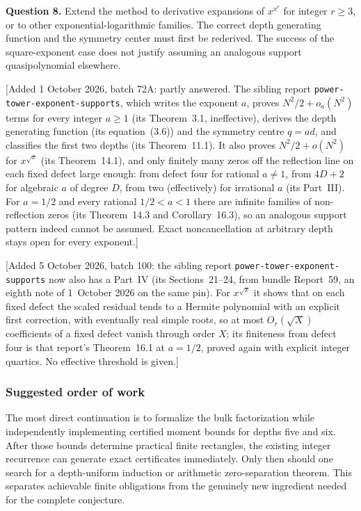 \documentclass[11pt,a4paper]{article}
\numberwithin{equation}{section}
\theoremstyle{definition}
\theoremstyle{remark}
\theoremstyle{plain}
\newcommand{\sibPTE}{\texttt{power-\allowbreak{}tower-\allowbreak{}exponent-\allowbreak{}supports}}
\begin{document}
\textbf{Question 8.}  Extend the method to derivative expansions of
$x^{x^r}$ for integer $r\ge3$, or to other exponential-logarithmic
families.  The correct depth generating function and the symmetry center
must first be rederived.  The success of the square-exponent case does
not justify assuming an analogous support quasipolynomial elsewhere.

[Added 1 October 2026, batch 72A: partly answered.  The sibling report \sibPTE{},
which writes the exponent $a$, proves $N^2/2+o_a(N^2)$ terms for every integer
$a\ge1$ (its Theorem~3.1, ineffective), derives the depth generating function
(its equation~(3.6)) and the symmetry centre $q=ad$, and classifies the first
two depths (its Theorem~11.1).  It also proves $N^2/2+o(N^2)$ for $x^{\sqrt x}$
(its Theorem~14.1), and only finitely many zeros off the reflection line on
each fixed defect large enough: from defect four for rational $a\ne1$, from
$4D+2$ for algebraic $a$ of degree $D$, from two (effectively) for irrational
$a$ (its Part~III).  For $a=1/2$ and every rational $1/2<a<1$ there are
infinite families of non-reflection zeros (its Theorem~14.3 and
Corollary~16.3), so an analogous support pattern indeed cannot be assumed.
Exact noncancellation at arbitrary depth stays open for every exponent.]

[Added 5 October 2026, batch 100: the sibling report \sibPTE{} now also has a
Part~IV (its Sections~21--24, from bundle Report~59, an eighth note of
1~October 2026 on the same pin).  For $x^{\sqrt x}$ it shows that on each
fixed defect the scaled residual tends to a Hermite polynomial with an
explicit first correction, with eventually real simple roots, so at most
$O_r(\sqrt X)$ coefficients of a fixed defect vanish through order $X$; its
finiteness from defect four is that report's Theorem~16.1 at $a=1/2$, proved
again with explicit integer quartics.  No effective threshold is given.]

\subsubsection{Suggested order of work}
The most direct continuation is to formalize the bulk factorization while
independently implementing certified moment bounds for depths five and
six.  After those bounds determine practical finite rectangles, the
existing integer recurrence can generate exact certificates immediately.
Only then should one search for a depth-uniform induction or arithmetic
zero-separation theorem.  This separates achievable finite obligations
from the genuinely new ingredient needed for the complete conjecture.
\end{document}
